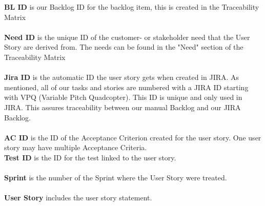 \noindent \textbf{BL ID} is our Backlog ID for the backlog item, this is created in the Traceability Matrix \\ \\
\textbf{Need ID} is the unique ID of the customer- or stakeholder need that the User Story are derived from. The needs can be found in the "Need" section of the Traceability Matrix \\ \\
\textbf{Jira ID} is the automatic ID the user story gets when created in JIRA. As mentioned, all of our tasks and stories are numbered with a JIRA ID starting with VPQ (Variable Pitch Quadcopter). This ID is unique and only used in JIRA. This assures traceability between our manual Backlog and our JIRA Backlog. \\ \\
\textbf{AC ID} is the ID of the Acceptance Criterion created for the user story. One user story may have multiple Acceptance Criteria.  \\
\textbf{Test ID} is the ID for the test linked to the user story. \\ \\
\textbf{Sprint} is the number of the Sprint where the User Story were treated. \\ \\
\textbf{User Story} includes the user story statement. \\
\\
